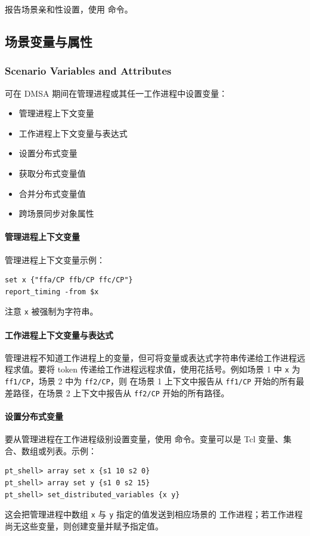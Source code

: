 报告场景亲和性设置，使用  命令。

\subsection{场景变量与属性}
\subsubsection*{Scenario Variables and Attributes}

可在 DMSA 期间在管理进程或其任一工作进程中设置变量：
\begin{itemize}
  \item 管理进程上下文变量
  \item 工作进程上下文变量与表达式
  \item 设置分布式变量
  \item 获取分布式变量值
  \item 合并分布式变量值
  \item 跨场景同步对象属性
\end{itemize}

\paragraph{管理进程上下文变量}
管理进程上下文变量示例：
\begin{lstlisting}
set x {"ffa/CP ffb/CP ffc/CP"}
report_timing -from $x
\end{lstlisting}
注意 \texttt{x} 被强制为字符串。

\paragraph{工作进程上下文变量与表达式}
管理进程不知道工作进程上的变量，但可将变量或表达式字符串传递给工作进程远程求值。要将 token 传递给工作进程远程求值，使用花括号。例如场景 1 中 \texttt{x} 为 \texttt{ff1/CP}，场景 2 中为 \texttt{ff2/CP}，则  在场景 1 上下文中报告从 \texttt{ff1/CP} 开始的所有最差路径，在场景 2 上下文中报告从 \texttt{ff2/CP} 开始的所有路径。

\paragraph{设置分布式变量}
要从管理进程在工作进程级别设置变量，使用  命令。变量可以是 Tcl 变量、集合、数组或列表。示例：
\begin{lstlisting}
pt_shell> array set x {s1 10 s2 0}
pt_shell> array set y {s1 0 s2 15}
pt_shell> set_distributed_variables {x y}
\end{lstlisting}
这会把管理进程中数组 \texttt{x} 与 \texttt{y} 指定的值发送到相应场景的
工作进程；若工作进程尚无这些变量，则创建变量并赋予指定值。

